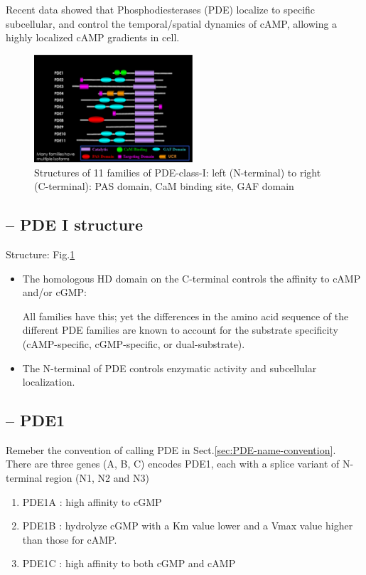 Recent data showed that Phosphodiesterases (PDE)  localize to specific
subcellular, and control the temporal/spatial dynamics of cAMP, allowing a
highly localized cAMP gradients in cell. 


\begin{figure}[hbt]
 \centerline{\includegraphics[height=4cm]{./images/PDE-class-I.eps}}
\caption{Structures of 11 families of PDE-class-I: left (N-terminal) to right
(C-terminal): PAS domain, CaM binding site, GAF domain}
\label{fig:PDE-class-I}
\end{figure}

\subsection{-- PDE I structure}
\label{sec:PDE-I-structure}

Structure: Fig.\ref{fig:PDE-class-I}
\begin{itemize}
  
  \item The homologous HD domain on the C-terminal controls 
  the affinity to cAMP and/or cGMP: 

All families have this; yet the differences in the amino acid sequence of the
different PDE families are known to account for the substrate specificity
(cAMP-specific, cGMP-specific, or dual-substrate).
  
  \item The N-terminal of PDE controls enzymatic activity and subcellular
  localization.

\end{itemize}


\subsection{-- PDE1}
\label{sec:PDE1}

Remeber the convention of calling PDE in Sect.\ref{sec:PDE-name-convention}.
There are three genes (A, B, C) encodes PDE1, each with a splice variant of
N-terminal region (N1, N2 and N3)
\begin{enumerate}
  \item PDE1A : high affinity to cGMP 
  
  \item PDE1B : hydrolyze cGMP with a Km value lower and a Vmax value higher
  than those for cAMP.
  
  \item PDE1C :  high affinity to both cGMP and cAMP 
\end{enumerate}


